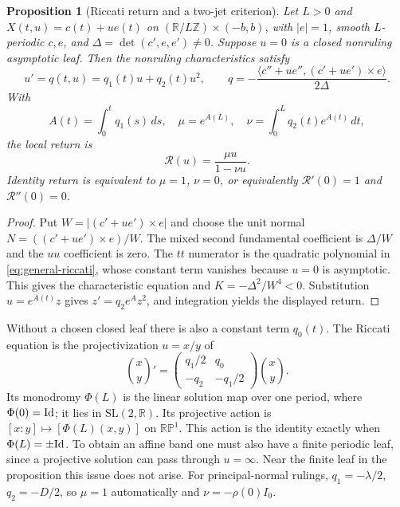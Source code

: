 \documentclass[11pt]{amsart}
\newtheorem{proposition}[theorem]{Proposition}
\theoremstyle{definition}
\theoremstyle{remark}
\newcommand{\R}{\mathbb R}\newcommand{\Sph}{\mathbb S}
\numberwithin{equation}{section}
\begin{document}
\begin{proposition}[Riccati return and a two-jet criterion]
\label{prop:general-ruled-return}
Let $L>0$ and $X(t,u)=c(t)+ue(t)$ on
$(\R/L\mathbb Z)\times(-b,b)$, with $|e|=1$, smooth $L$-periodic $c,e$, and
$\Delta=\det(c',e,e')\ne0$. Suppose $u=0$ is a closed nonruling
asymptotic leaf. Then the nonruling characteristics satisfy
\begin{equation}\label{eq:general-riccati}
 u'=q(t,u)=q_1(t)u+q_2(t)u^2,
 \qquad q=-\frac{\langle c''+ue'',(c'+ue')\times e\rangle}{2\Delta}.
\end{equation}
With
\[
 A(t)=\int_0^tq_1(s)\,ds,\quad \mu=e^{A(L)},\quad
 \nu=\int_0^Lq_2(t)e^{A(t)}\,dt,
\]
the local return is
\begin{equation}\label{eq:general-return}
 \mathcal R(u)=\frac{\mu u}{1-\nu u}.
\end{equation}
Identity return is equivalent to $\mu=1$, $\nu=0$, or equivalently
$\mathcal R'(0)=1$ and $\mathcal R''(0)=0$.
\end{proposition}
\begin{proof}
Put $W=|(c'+ue')\times e|$ and choose the unit normal
$N=((c'+ue')\times e)/W$. The mixed second fundamental coefficient
is $\Delta/W$ and the $uu$ coefficient is zero. The $tt$ numerator
is the quadratic polynomial in \eqref{eq:general-riccati}, whose constant
term vanishes because $u=0$ is asymptotic. This gives the characteristic
equation and $K=-\Delta^2/W^4<0$. Substitution $u=e^{A(t)}z$ gives
$z'=q_2e^Az^2$, and integration yields the displayed return.
\end{proof}
Without a chosen closed leaf there is also a constant term $q_0(t)$.
The Riccati equation is the projectivization $u=x/y$ of
\[
 \binom{x}{y}'=
 \begin{pmatrix}q_1/2&q_0\\-q_2&-q_1/2\end{pmatrix}\binom{x}{y}.
\]
Its monodromy $\Phi(L)$ is the linear solution map over one period,
where $\Phi(0)=\mathrm{Id}$; it lies in $\mathrm{SL}(2,\R)$.
Its projective action is $[x:y]\mapsto[\Phi(L)(x,y)]$ on
$\mathbb{RP}^1$. This action is the identity exactly when
$\Phi(L)=\pm\mathrm{Id}$. To obtain an affine band one must also have a finite
periodic leaf, since a projective solution can pass through $u=\infty$.
Near the finite leaf in the proposition this issue does not arise.
For principal-normal rulings, $q_1=-\lambda/2$, $q_2=-D/2$, so
$\mu=1$ automatically and $\nu=-\rho(0)I_0$.
\end{document}
